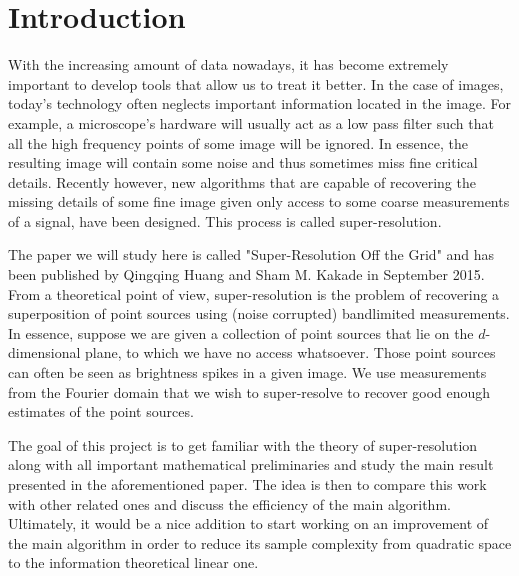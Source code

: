 \chapter{Introduction}
With the increasing amount of data nowadays, it has become extremely important to develop tools that allow us to treat it better. In the case of images, today's technology often neglects important information located in the image. For example, a microscope's hardware will usually act as a low pass filter such that all the high frequency points of some image will be ignored. In essence, the resulting image will contain some noise and thus sometimes miss fine critical details. Recently however, new algorithms that are capable of recovering the missing details of some fine image given only access to some coarse measurements of a signal, have been designed. This process is called super-resolution.\par 

The paper we will study here is called "Super-Resolution Off the Grid" and has been published by Qingqing Huang and Sham M. Kakade in September 2015. From a theoretical point of view, super-resolution is the problem of recovering a superposition of point sources using (noise corrupted) bandlimited measurements. In essence, suppose we are given a collection of point sources that lie on the $d$-dimensional plane, to which we have no access whatsoever. Those point sources can often be seen as brightness spikes in a given image. We use measurements from the Fourier domain that we wish to super-resolve to recover good enough estimates of the point sources.\par 

The goal of this project is to get familiar with the theory of super-resolution along with all important mathematical preliminaries and study the main result presented in the aforementioned paper. The idea is then to compare this work with other related ones and discuss the efficiency of the main algorithm. Ultimately, it would be a nice addition to start working on an improvement of the main algorithm in order to reduce its sample complexity from quadratic space to the information theoretical linear one.